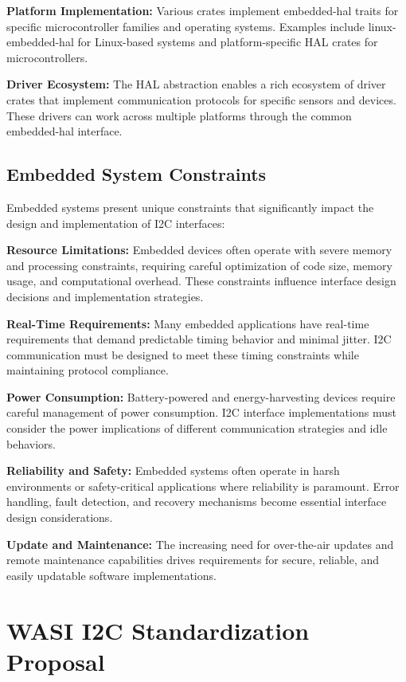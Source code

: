 \textbf{Platform Implementation:} Various crates implement embedded-hal traits for specific microcontroller families and operating systems. Examples include linux-embedded-hal for Linux-based systems and platform-specific HAL crates for microcontrollers.

\textbf{Driver Ecosystem:} The HAL abstraction enables a rich ecosystem of driver crates that implement communication protocols for specific sensors and devices. These drivers can work across multiple platforms through the common embedded-hal interface.

\subsection{Embedded System Constraints}
\label{subsec:embedded-constraints}

Embedded systems present unique constraints that significantly impact the design and implementation of I2C interfaces:

\textbf{Resource Limitations:} Embedded devices often operate with severe memory and processing constraints, requiring careful optimization of code size, memory usage, and computational overhead. These constraints influence interface design decisions and implementation strategies.

\textbf{Real-Time Requirements:} Many embedded applications have real-time requirements that demand predictable timing behavior and minimal jitter. I2C communication must be designed to meet these timing constraints while maintaining protocol compliance.

\textbf{Power Consumption:} Battery-powered and energy-harvesting devices require careful management of power consumption. I2C interface implementations must consider the power implications of different communication strategies and idle behaviors.

\textbf{Reliability and Safety:} Embedded systems often operate in harsh environments or safety-critical applications where reliability is paramount. Error handling, fault detection, and recovery mechanisms become essential interface design considerations.

\textbf{Update and Maintenance:} The increasing need for over-the-air updates and remote maintenance capabilities drives requirements for secure, reliable, and easily updatable software implementations.

\section{WASI I2C Standardization Proposal}
\label{sec:wasi-i2c-proposal}

